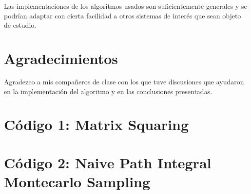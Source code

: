 \documentclass[%
 reprint,
 amsmath,amssymb,
 aps,
 pra,
]{revtex4-2}
\begin{document}
Las implementaciones de los algoritmos usados son suficientemente generales y se podrían adaptar con cierta facilidad a otros sistemas de interés que sean objeto de estudio.

\section*{Agradecimientos}
Agradezco a mis compañeros de clase con los que tuve discusiones que ayudaron en la implementación del algoritmo y en las conclusiones presentadas. 

\nocite{*}


\newpage



\appendix

\begin{widetext}

\section{Código 1: Matrix Squaring\label{appx:codigo_matrix_squaring}}


\section{Código 2: Naive Path Integral Montecarlo Sampling\label{appx:codigo_temperatura_finita}}


\end{widetext}
\end{document}
